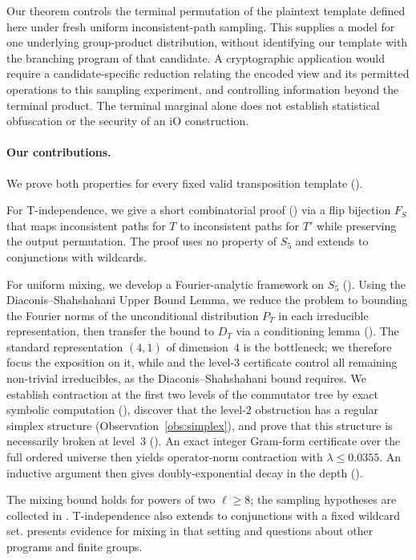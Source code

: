 \documentclass[version=final]{iacrcc}
\begin{document}
Our theorem controls the terminal permutation of the plaintext template defined
here under fresh uniform inconsistent-path sampling. This supplies a model for
one underlying group-product distribution, without identifying our template
with the branching program of that candidate. A cryptographic application would
require a candidate-specific reduction relating the encoded view and its
permitted operations to this sampling experiment, and controlling information
beyond the terminal product. The terminal marginal alone does not establish
statistical obfuscation or the security of an iO construction.

\paragraph{Our contributions.}
We prove both properties for every fixed valid transposition template ().

For T-independence, we give a short combinatorial proof ()
via a flip bijection $F_S$ that maps inconsistent paths for $T$ to
inconsistent paths for $T'$ while preserving the output permutation. The proof
uses no property of $S_5$ and extends to conjunctions with wildcards.

For uniform mixing, we develop a Fourier-analytic framework on $S_5$
(). Using the Diaconis--Shahshahani Upper Bound
Lemma, we reduce the problem to bounding the Fourier norms of the unconditional
distribution $P_T$ in each irreducible representation, then transfer the bound to
$D_T$ via a conditioning lemma (). The standard
representation $(4,1)$ of dimension~$4$ is the bottleneck; we therefore focus the
exposition on it, while  and the level-$3$ certificate control
all remaining non-trivial irreducibles, as the Diaconis--Shahshahani bound requires. We establish contraction at the first
two levels of the commutator tree by exact symbolic computation
(), discover that the level-$2$ obstruction
has a regular simplex structure (Observation~\ref{obs:simplex}), and prove that this
structure is necessarily broken at level~$3$ (). An exact
integer Gram-form certificate over the full ordered universe then yields
operator-norm contraction with $\lambda \leq 0.0355$. An inductive argument
then gives doubly-exponential decay in the depth ().

The mixing bound holds for powers of two $\ell \geq 8$; the sampling hypotheses
are collected in . T-independence also extends to
conjunctions with a fixed wildcard set.  presents evidence
for mixing in that setting and questions about other programs and finite groups.
\end{document}
